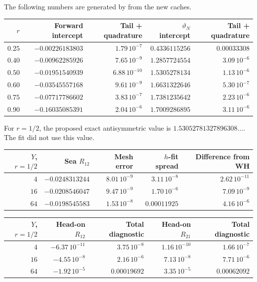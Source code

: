\C The following numbers are generated by  from the new caches.
\begin{center}\small\begin{tabular}{rrrrr}\toprule
$r$ & Forward intercept & Tail + quadrature & $\vartheta_N$ intercept & Tail + quadrature\\\midrule
$0.25$ & $-0.00226183803$ & $1.79\,10^{-7}$ & $0.4336115256$ & $0.00033308$\\
$0.40$ & $-0.00962285926$ & $7.65\,10^{-9}$ & $1.2857724554$ & $3.09\,10^{-6}$\\
$0.50$ & $-0.01951540939$ & $6.88\,10^{-10}$ & $1.5305278134$ & $1.13\,10^{-6}$\\
$0.60$ & $-0.03545557168$ & $9.61\,10^{-9}$ & $1.6631322646$ & $5.30\,10^{-7}$\\
$0.75$ & $-0.07717786602$ & $3.83\,10^{-7}$ & $1.7381235642$ & $2.23\,10^{-6}$\\
$0.90$ & $-0.16035085391$ & $2.04\,10^{-6}$ & $1.7009286895$ & $3.11\,10^{-6}$\\
\bottomrule\end{tabular}\end{center}
\C For $r=1/2$, the proposed exact antisymmetric value is $1.53052781327896308\ldots$. The fit did not use this value.
\begin{center}\small\begin{tabular}{rrrrr}\toprule
$Y$, $r=1/2$ & Sea $R_{12}$ & Mesh error & $h$-fit spread & Difference from WH\\\midrule
$4$ & $-0.0248313244$ & $8.01\,10^{-9}$ & $3.11\,10^{-8}$ & $2.62\,10^{-11}$\\
$16$ & $-0.0208546047$ & $9.47\,10^{-9}$ & $1.70\,10^{-6}$ & $7.09\,10^{-9}$\\
$64$ & $-0.0198545583$ & $1.53\,10^{-8}$ & $0.00011925$ & $4.16\,10^{-6}$\\
\bottomrule\end{tabular}\end{center}
\begin{center}\small\begin{tabular}{rrrrr}\toprule
$Y$, $r=1/2$ & Head-on $R_{12}$ & Total diagnostic & Head-on $R_{21}$ & Total diagnostic\\\midrule
$4$ & $-6.37\,10^{-11}$ & $3.75\,10^{-8}$ & $1.16\,10^{-10}$ & $1.66\,10^{-7}$\\
$16$ & $-4.55\,10^{-8}$ & $2.16\,10^{-6}$ & $7.13\,10^{-8}$ & $7.71\,10^{-6}$\\
$64$ & $-1.92\,10^{-5}$ & $0.00019692$ & $3.35\,10^{-5}$ & $0.00062092$\\
\bottomrule\end{tabular}\end{center}
